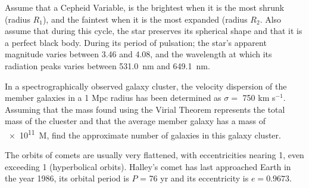 \documentclass[11pt, a4paper]{exam}
\begin{document}
	\begin{questions}
		\question
		Assume that a Cepheid Variable, is the brightest when it is the most shrunk (radius $R_1$), and the faintest when it is the most expanded (radius $R_2$. Also assume that during this cycle, the star preserves its spherical shape and that it is a perfect black body. During its period of pulsation; the star's apparent magnitude varies between 3.46 and 4.08, and the wavelength at which its radiation peaks varies between \SI{531.0}{nm} and \SI{649.1}{nm}.
		
		\question
		In a spectrographically observed galaxy cluster, the velocity dispersion of the member galaxies in a 1 Mpc radius has been determined as $\sigma =$ 750 km s$^{-1}$. Assuming that the mass found using the Virial Theorem represents the total mass of the cluester and that the average member galaxy has a mass of  \SI{e11}{M_\odot}, find the approximate number of galaxies in this galaxy cluster.
		
		\question
		The orbits of comets are usually very flattened, with eccentricities nearing 1, even exceeding 1 (hyperbolical orbits). Halley's comet has last approached Earth in the year 1986, its orbital period is $P$  = 76 yr and its eccentricity is $e = 0.9673$.
\end{questions}
\end{document}
